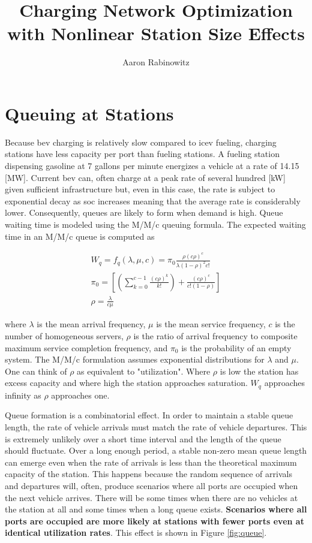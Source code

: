 \documentclass[12pt]{article}
\title{Charging Network Optimization with Nonlinear Station Size Effects}
\author{Aaron Rabinowitz}
\date{}
\begin{document}
\maketitle

\section{Queuing at Stations}

Because \gls{bev} charging is relatively slow compared to \gls{icev} fueling, charging stations have less capacity per port than fueling stations. A fueling station dispensing gasoline at 7 gallons per minute energizes a vehicle at a rate of 14.15 [MW]. Current \gls{bev} can, often charge at a peak rate of several hundred [kW] given sufficient infrastructure but, even in this case, the rate is subject to exponential decay as \gls{soc} increases meaning that the average rate is considerably lower. Consequently, queues are likely to form when demand is high. Queue waiting time is modeled using the M/M/c queuing formula. The expected waiting time in an M/M/c queue is computed as

\begin{gather}
	W_q = f_{q}(\lambda, \mu, c) = \pi_0\frac{\rho(c\rho)^c}{\lambda(1-\rho)^2c!}\label{eq:w_q}\\
	\pi_0=\left[\left(\sum_{k = 0}^{c - 1}\frac{(c\rho)^k}{k!}\right) + \frac{(c\rho)^c}{c!(1 - \rho)}\right]\\
	\rho = \frac{\lambda}{c\mu}
\end{gather}

where $\lambda$ is the mean arrival frequency, $\mu$ is the mean service frequency, $c$ is the number of homogeneous servers, $\rho$ is the ratio of arrival frequency to composite maximum service completion frequency, and $\pi_0$ is the probability of an empty system. The M/M/c formulation assumes exponential distributions for $\lambda$ and $\mu$. One can think of $\rho$ as equivalent to "utilization". Where $\rho$ is low the station has excess capacity and where high the station approaches saturation. $W_q$ approaches infinity as $\rho$ approaches one.

Queue formation is a combinatorial effect. In order to maintain a stable queue length, the rate of vehicle arrivals must match the rate of vehicle departures. This is extremely unlikely over a short time interval and the length of the queue should fluctuate. Over a long enough period, a stable non-zero mean queue length can emerge even when the rate of arrivals is less than the theoretical maximum capacity of the station. This happens because the random sequence of arrivals and departures will, often, produce scenarios where all ports are occupied when the next vehicle arrives. There will be some times when there are no vehicles at the station at all and some times when a long queue exists. \textbf{Scenarios where all ports are occupied are more likely at stations with fewer ports even at identical utilization rates}. This effect is shown in Figure \ref{fig:queue}.
\end{document}
